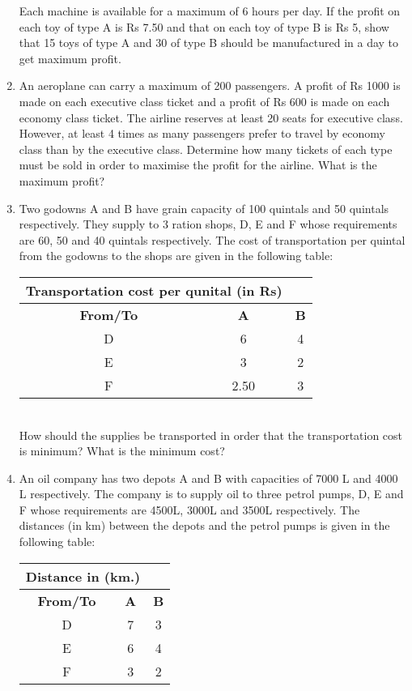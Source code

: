 \begin{enumerate}[label=\arabic*.,ref=\thesection.\theenumi]
Each machine is available for a maximum of 6 hours per day. If the profit on
each toy of type A is Rs 7.50 and that on each toy of type B is Rs 5, show that 15
toys of type A and 30 of type B should be manufactured in a day to get maximum
profit.\\
\item An aeroplane can carry a maximum of 200 passengers. A profit of Rs 1000 is
made on each executive class ticket and a profit of Rs 600 is made on each
economy class ticket. The airline reserves at least 20 seats for executive class.
However, at least 4 times as many passengers prefer to travel by economy class
than by the executive class. Determine how many tickets of each type must be
sold in order to maximise the profit for the airline. What is the maximum profit?\\
\item Two godowns A and B have grain capacity of 100 quintals and 50 quintals
respectively. They supply to 3 ration shops, D, E and F whose requirements are
60, 50 and 40 quintals respectively. The cost of transportation per quintal from
the godowns to the shops are given in the following table:\\
\begin{tabular}{|c|c|c|}
\hline
 \multicolumn{2}{|l}{\textbf{ Transportation cost per qunital (in Rs)}}& \\ \cline{2-3}
\hline
\textbf {From/To}&\textbf{A}&\textbf{B}\\
\hline
D&6&4\\
\hline
 E&3&2\\
 \hline 
 F&2.50&3\\
 \hline

\end{tabular}\\


How should the supplies be transported in order that the transportation cost is
minimum? What is the minimum cost?\\
\item An oil company has two depots A and B with capacities of 7000 L and 4000 L
respectively. The company is to supply oil to three petrol pumps, D, E and F
whose requirements are 4500L, 3000L and 3500L respectively. The distances
(in km) between the depots and the petrol pumps is given in the following table:\\
\begin{tabular}{|c|c|c|}
\hline
 \multicolumn{2}{|l}{\textbf{Distance in (km.)}}& \\ \cline{2-3}
\hline
\textbf {From/To}&\textbf{A}&\textbf{B}\\
\hline
D&7&3\\
\hline
 E&6&4\\
 \hline 
 F&3&2\\
 \hline


\end{tabular}
\end{enumerate}
